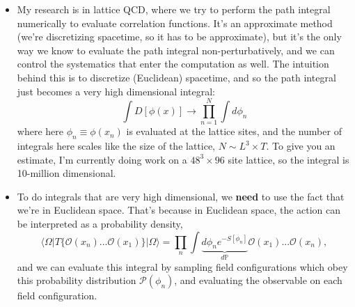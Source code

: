 \documentclass[12pt, oneside]{article}   	%
\theoremstyle{definition}
\begin{document}
\begin{itemize}

	\item My research is in lattice QCD, where we try to perform the path integral numerically to evaluate correlation functions. It's an approximate method (we're discretizing spacetime, so it has to be approximate), but it's the only way we know to evaluate the path integral non-perturbatively, and we can control the systematics that enter the computation as well. The intuition behind this is to discretize (Euclidean) spacetime, and so the path integral just becomes a very high dimensional integral:
	\begin{equation}
		\int D[\phi(x)]\longrightarrow\prod_{n = 1}^N \int d \phi_n
	\end{equation}
	where here $\phi_n\equiv \phi(x_n)$ is evaluated at the lattice sites, and the number of integrals here scales like the size of the lattice, $N\sim L^3\times T$. To give you an estimate, I'm currently doing work on a $48^3\times 96$ site lattice, so the integral is 10-million dimensional. 
	
	\item To do integrals that are very high dimensional, we \textbf{need} to use the fact that we're in Euclidean space. That's because in Euclidean space, the action can be interpreted as a probability density,
	\begin{equation}
		\langle\Omega | T\{\mathcal O(x_n) ... \mathcal O(x_1) \} | \Omega\rangle = \prod_n \int \underbrace{ d\phi_n e^{-S[\phi_n]} }_{d\mathbb P} \mathcal O(x_1) ... \mathcal O(x_n),
	\end{equation}
	and we can evaluate this integral by sampling field configurations which obey this probability distribution $\mathcal P(\phi_n)$, and evaluating the observable on each field configuration. 
	

\end{itemize}
\end{document}
